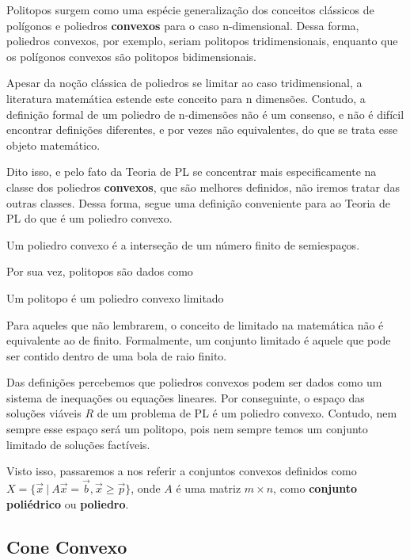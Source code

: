 Politopos surgem como uma espécie generalização dos conceitos clássicos de polígonos e poliedros \textbf{convexos} para o caso n-dimensional. Dessa forma, poliedros convexos, por exemplo, seriam politopos tridimensionais, enquanto que os polígonos convexos são politopos bidimensionais. 

Apesar da noção clássica de poliedros se limitar ao caso tridimensional, a literatura matemática estende este conceito para n dimensões. Contudo, a definição formal de um poliedro de n-dimensões não é um consenso, e não é difícil encontrar definições diferentes, e por vezes não equivalentes, do que se trata esse objeto matemático.

Dito isso, e pelo fato da Teoria de PL se concentrar mais especificamente na classe dos poliedros \textbf{convexos}, que são melhores definidos, não iremos tratar das outras classes. Dessa forma, segue uma definição conveniente para ao Teoria de PL do que é um poliedro convexo.

\begin{def:poliedro convexo}
	Um poliedro convexo é a interseção de um número finito de semiespaços.
\end{def:poliedro convexo}

Por sua vez, politopos são dados como

\begin{def:politopo}
	Um politopo é um poliedro convexo limitado
\end{def:politopo}

Para aqueles que não lembrarem, o conceito de limitado na matemática não é equivalente ao de finito. Formalmente, um conjunto limitado é aquele que pode ser contido dentro de uma bola de raio finito. 

Das definições percebemos que poliedros convexos podem ser dados como um sistema de inequações ou equações lineares. Por conseguinte, o espaço das soluções viáveis $R$ de um problema de PL é um poliedro convexo. Contudo, nem sempre esse espaço será um politopo, pois nem sempre temos um conjunto limitado de soluções factíveis.

Visto isso, passaremos a nos referir a conjuntos convexos definidos como $X = \{\vec{x}\ |\ A\vec{x} = \vec{b}, \vec{x} \geq \vec{p}\}$, onde $A$ é uma matriz $m \times n$, como \textbf{conjunto poliédrico} ou \textbf{poliedro}. 

\subsection{Cone Convexo}


